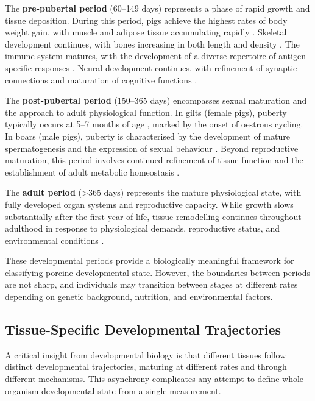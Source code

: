 The \textbf{pre-pubertal period} (60--149 days) represents a phase of rapid growth and tissue deposition. During this period, pigs achieve the highest rates of body weight gain, with muscle and adipose tissue accumulating rapidly \parencite{whittemore_whittemores_2006}. Skeletal development continues, with bones increasing in both length and density \parencite{reiland_growth_1978}. The immune system matures, with the development of a diverse repertoire of antigen-specific responses \parencite{georgountzou_postnatal_2017, mair_porcine_2014}. Neural development continues, with refinement of synaptic connections and maturation of cognitive functions \parencite{semple_brain_2013}.

The \textbf{post-pubertal period} (150--365 days) encompasses sexual maturation and the approach to adult physiological function. In gilts (female pigs), puberty typically occurs at 5--7 months of age \parencite{swindle_swine_2012}, marked by the onset of oestrous cycling. In boars (male pigs), puberty is characterised by the development of mature spermatogenesis and the expression of sexual behaviour \parencite{lents_physiological_2020}. Beyond reproductive maturation, this period involves continued refinement of tissue function and the establishment of adult metabolic homeostasis \parencite{whittemore_whittemores_2006}.

The \textbf{adult period} (>365 days) represents the mature physiological state, with fully developed organ systems and reproductive capacity. While growth slows substantially after the first year of life, tissue remodelling continues throughout adulthood in response to physiological demands, reproductive status, and environmental conditions \parencite{swindle_swine_2012}.

These developmental periods provide a biologically meaningful framework for classifying porcine developmental state. However, the boundaries between periods are not sharp, and individuals may transition between stages at different rates depending on genetic background, nutrition, and environmental factors.

\subsection{Tissue-Specific Developmental Trajectories}

A critical insight from developmental biology is that different tissues follow distinct developmental trajectories, maturing at different rates and through different mechanisms. This asynchrony complicates any attempt to define whole-organism developmental state from a single measurement.

